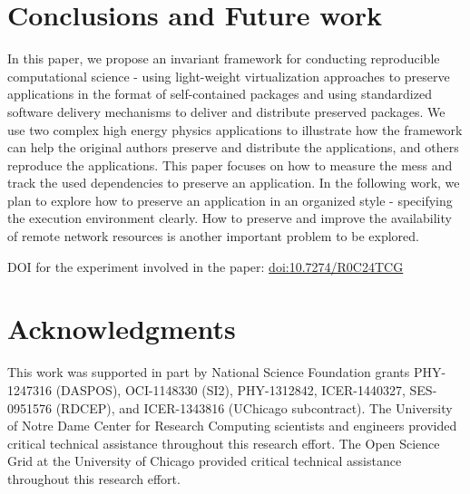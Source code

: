 \documentclass[procedia]{easychair}
\begin{document}
\section{Conclusions and Future work}
In this paper, we propose an invariant framework for conducting reproducible computational science - using light-weight virtualization approaches to preserve applications in the format of self-contained packages and using standardized software delivery mechanisms to deliver and distribute preserved packages.
We use two complex high energy physics applications to illustrate how the framework can help the original authors preserve and distribute the applications, and others reproduce the applications.
This paper focuses on how to measure the mess and track the used dependencies to preserve an application.
In the following work, we plan to explore how to preserve an application in an organized style - specifying the execution environment clearly.
How to preserve and improve the availability of remote network resources is another important problem to be explored.

\small
\vspace{-10pt}
DOI for the experiment involved in the paper: \url{doi:10.7274/R0C24TCG}

\section*{Acknowledgments}

This work was supported in part by National Science Foundation grants PHY-1247316 (DASPOS), 
OCI-1148330 (SI2), PHY-1312842, ICER-1440327, SES-0951576 (RDCEP), and ICER-1343816 (UChicago subcontract).
The University of Notre Dame Center for Research Computing scientists and engineers provided critical technical assistance throughout this research effort.
The Open Science Grid at the University of Chicago provided critical technical assistance throughout this research effort.

\vspace{-10pt}


\end{document}
